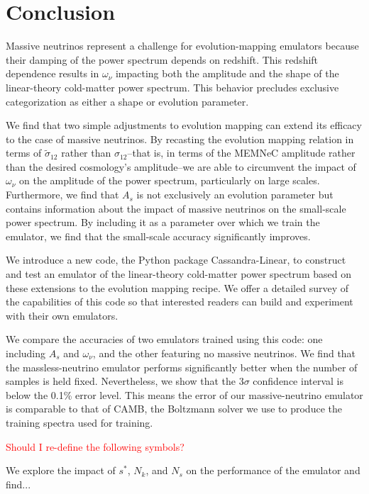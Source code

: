 \chapter{Conclusion}
\label{chap: conclusion}

Massive neutrinos represent a challenge for evolution-mapping emulators
because their damping of the power spectrum depends on redshift.
This redshift dependence results in $\omega_\nu$ impacting both the
amplitude and the shape of the linear-theory cold-matter power spectrum.
This behavior precludes exclusive categorization as either a shape or
evolution parameter.

We find that two simple adjustments to evolution mapping can extend its
efficacy to the case of massive neutrinos. By recasting the evolution mapping
relation in terms of $\tilde{\sigma}_12$ rather than $\sigma_{12}$--that is,
in terms of the MEMNeC amplitude rather than the desired cosmology's
amplitude--we are able to circumvent the impact of $\omega_\nu$ on the
amplitude of the power spectrum, particularly on large scales. Furthermore,
we find that $A_s$ is not exclusively an evolution parameter but contains
information about the impact of massive neutrinos on the small-scale
power spectrum. By including it as a parameter over which we train the
emulator, we find that the small-scale accuracy significantly improves.

We introduce a new code, the Python package Cassandra-Linear, to construct
and test an emulator of the linear-theory cold-matter power spectrum based on
these extensions to the evolution mapping recipe. We offer a detailed survey
of the capabilities of this code so that interested readers can build and
experiment with their own emulators.

We compare the accuracies of two emulators trained using this code: one
including $A_s$ and $\omega_\nu$, and the other featuring no massive 
neutrinos. We find that the massless-neutrino emulator performs significantly
better when the number of samples is held fixed. Nevertheless, we show that
the $3\sigma$ confidence interval is below the 0.1\% error level. This means
the error of our massive-neutrino emulator is
comparable to that of CAMB, the Boltzmann solver we use to produce the
training spectra used for training.

\textcolor{red}{Should I re-define the following symbols?}

We explore the impact of $s^*$, $N_k$, and $N_s$ on the performance of the
emulator and find...

